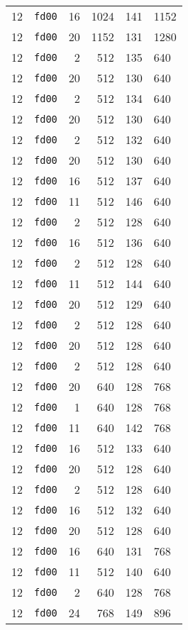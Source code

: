 \documentclass{article}
\begin{document}
\begin{table}[h!]
\begin{tabular}{llrrrl}
    12 & \texttt{fd00} & 16 & 1024 & 141 & 1152 \\
    12 & \texttt{fd00} & 20 & 1152 & 131 & 1280 \\
    12 & \texttt{fd00} & 2 & 512 & 135 & 640 \\
    12 & \texttt{fd00} & 20 & 512 & 130 & 640 \\
    12 & \texttt{fd00} & 2 & 512 & 134 & 640 \\
    12 & \texttt{fd00} & 20 & 512 & 130 & 640 \\
    12 & \texttt{fd00} & 2 & 512 & 132 & 640 \\
    12 & \texttt{fd00} & 20 & 512 & 130 & 640 \\
    12 & \texttt{fd00} & 16 & 512 & 137 & 640 \\
    12 & \texttt{fd00} & 11 & 512 & 146 & 640 \\
    12 & \texttt{fd00} & 2 & 512 & 128 & 640 \\
    12 & \texttt{fd00} & 16 & 512 & 136 & 640 \\
    12 & \texttt{fd00} & 2 & 512 & 128 & 640 \\
    12 & \texttt{fd00} & 11 & 512 & 144 & 640 \\
    12 & \texttt{fd00} & 20 & 512 & 129 & 640 \\
    12 & \texttt{fd00} & 2 & 512 & 128 & 640 \\
    12 & \texttt{fd00} & 20 & 512 & 128 & 640 \\
    12 & \texttt{fd00} & 2 & 512 & 128 & 640 \\
    12 & \texttt{fd00} & 20 & 640 & 128 & 768 \\
    12 & \texttt{fd00} & 1 & 640 & 128 & 768 \\
    12 & \texttt{fd00} & 11 & 640 & 142 & 768 \\
    12 & \texttt{fd00} & 16 & 512 & 133 & 640 \\
    12 & \texttt{fd00} & 20 & 512 & 128 & 640 \\
    12 & \texttt{fd00} & 2 & 512 & 128 & 640 \\
    12 & \texttt{fd00} & 16 & 512 & 132 & 640 \\
    12 & \texttt{fd00} & 20 & 512 & 128 & 640 \\
    12 & \texttt{fd00} & 16 & 640 & 131 & 768 \\
    12 & \texttt{fd00} & 11 & 512 & 140 & 640 \\
    12 & \texttt{fd00} & 2 & 640 & 128 & 768 \\
    12 & \texttt{fd00} & 24 & 768 & 149 & 896 \\

\end{tabular}
\end{table}
\end{document}
